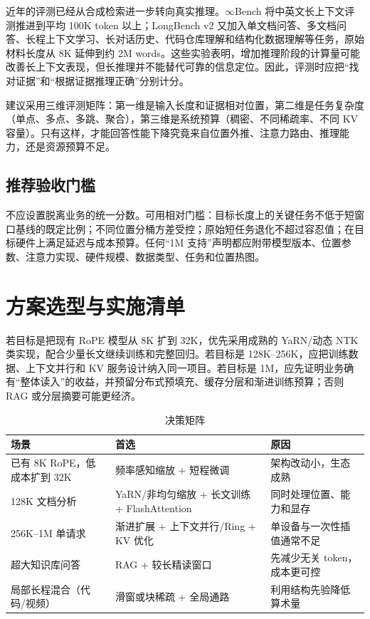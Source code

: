 \documentclass[UTF8,10pt,a4paper,fontset=none]{ctexart}
\begin{document}
近年的评测已经从合成检索进一步转向真实推理。$\infty$Bench 将中英文长上下文评测推进到平均 100K token 以上\cite{zhang2024infinitebench}；LongBench v2 又加入单文档问答、多文档问答、长程上下文学习、长对话历史、代码仓库理解和结构化数据理解等任务，原始材料长度从 8K 延伸到约 2M words\cite{bai2024longbenchv2}。这些实验表明，增加推理阶段的计算量可能改善长上下文表现，但长推理并不能替代可靠的信息定位。因此，评测时应把“找对证据”和“根据证据推理正确”分别计分。

建议采用三维评测矩阵：第一维是输入长度和证据相对位置，第二维是任务复杂度（单点、多点、多跳、聚合），第三维是系统预算（稠密、不同稀疏率、不同 KV 容量）。只有这样，才能回答性能下降究竟来自位置外推、注意力路由、推理能力，还是资源预算不足。

\subsection{推荐验收门槛}
不应设置脱离业务的统一分数。可用相对门槛：目标长度上的关键任务不低于短窗口基线的既定比例；不同位置分桶方差受控；原始短任务退化不超过容忍值；在目标硬件上满足延迟与成本预算。任何“1M 支持”声明都应附带模型版本、位置参数、注意力实现、硬件规模、数据类型、任务和位置热图。

\section{方案选型与实施清单}
若目标是把现有 RoPE 模型从 8K 扩到 32K，优先采用成熟的 YaRN/动态 NTK 类实现，配合少量长文继续训练和完整回归。若目标是 128K--256K，应把训练数据、上下文并行和 KV 服务设计纳入同一项目。若目标是 1M，应先证明业务确有“整体读入”的收益，并预留分布式预填充、缓存分层和渐进训练预算；否则 RAG 或分层摘要可能更经济。

\begin{table}[h]
\centering\small
\caption{决策矩阵}
\begin{tabularx}{\textwidth}{p{3cm}X X}
\toprule
场景 & 首选 & 原因\\
\midrule
已有 8K RoPE，低成本扩到 32K & 频率感知缩放 + 短程微调 & 架构改动小，生态成熟\\
128K 文档分析 & YaRN/非均匀缩放 + 长文训练 + FlashAttention & 同时处理位置、能力和显存\\
256K--1M 单请求 & 渐进扩展 + 上下文并行/Ring + KV 优化 & 单设备与一次性插值通常不足\\
超大知识库问答 & RAG + 较长精读窗口 & 先减少无关 token，成本更可控\\
局部长程混合（代码/视频） & 滑窗或块稀疏 + 全局通路 & 利用结构先验降低算术量\\
\bottomrule
\end{tabularx}
\end{table}
\end{document}
